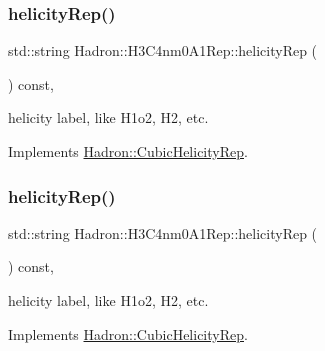 \mbox{\label{structHadron_1_1H3C4nm0A1Rep_a09ac0cfc6730bea0401124a20d15bb0f}} 
\subsubsection{\texorpdfstring{helicityRep()}{helicityRep()}\hspace{0.1cm}{\footnotesize\ttfamily [1/2]}}
{\footnotesize\ttfamily std\+::string Hadron\+::\+H3\+C4nm0\+A1\+Rep\+::helicity\+Rep (\begin{DoxyParamCaption}{ }\end{DoxyParamCaption}) const\hspace{0.3cm}{\ttfamily [inline]}, {\ttfamily [virtual]}}

helicity label, like H1o2, H2, etc. 

Implements \mbox{\hyperlink{structHadron_1_1CubicHelicityRep_af1096946b7470edf0a55451cc662f231}{Hadron\+::\+Cubic\+Helicity\+Rep}}.

\mbox{\label{structHadron_1_1H3C4nm0A1Rep_a09ac0cfc6730bea0401124a20d15bb0f}} 
\subsubsection{\texorpdfstring{helicityRep()}{helicityRep()}\hspace{0.1cm}{\footnotesize\ttfamily [2/2]}}
{\footnotesize\ttfamily std\+::string Hadron\+::\+H3\+C4nm0\+A1\+Rep\+::helicity\+Rep (\begin{DoxyParamCaption}{ }\end{DoxyParamCaption}) const\hspace{0.3cm}{\ttfamily [inline]}, {\ttfamily [virtual]}}

helicity label, like H1o2, H2, etc. 

Implements \mbox{\hyperlink{structHadron_1_1CubicHelicityRep_af1096946b7470edf0a55451cc662f231}{Hadron\+::\+Cubic\+Helicity\+Rep}}.

\mbox{\label{structHadron_1_1H3C4nm0A1Rep_a3634b28d2dcd2a2aab44846494b1f39c}} 
